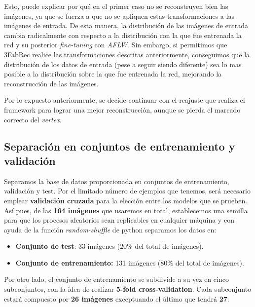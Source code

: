             \medskip
            
            \noindent Esto, puede explicar por qué en el primer caso no se reconstruyen bien las imágenes, ya que se fuerza a que no se apliquen estas transformaciones a las imágenes de entrada. De esta manera, la distribución de las imágenes de entrada cambia radicalmente con respecto a la distribución con la que fue entrenada la red y su posterior \textit{fine-tuning} con \textit{AFLW}. Sin embargo, si permitimos que 3FabRec realice las transformaciones descritas anteriormente, conseguimos que la distribución de los datos de entrada (pese a seguir siendo diferente) sea lo mas  posible a la distribución sobre la que fue entrenada la red, mejorando la reconstrucción de las imágenes. 
            
            \medskip
            
            
            \noindent Por lo expuesto anteriormente, se decide continuar con el reajuste que realiza el framework para lograr una mejor reconstrucción, aunque se pierda el marcado correcto del \textit{vertex}.

    \subsection{Separación en conjuntos de entrenamiento y validación}
        \noindent Separamos la base de datos proporcionada en conjuntos de entrenamiento, validación y test. Por el limitado número de ejemplos que tenemos, será necesario emplear \textbf{validación cruzada} para la elección entre los modelos que se prueben. Así pues, de las \textbf{164 imágenes} que usaremos en total, establecemos una semilla para que los procesos aleatorios sean replicables en cualquier máquina y con ayuda de la función \textit{random-shuffle} de python separamos los datos en: 

        \begin{itemize}
            \item \textbf{Conjunto de test}: 33 imágenes ($20\%$ del total de imágenes).
            \item \textbf{Conjunto de entrenamiento:} 131 imágenes ($80\%$ del total de imágenes).
        \end{itemize}

        \noindent Por otro lado, el conjunto de entrenamiento se subdivide a su vez en cinco subconjuntos, con la idea de realizar \textbf{5-fold cross-validation}. Cada subconjunto estará compuesto por \textbf{26 imágenes} exceptuando el último que tendrá \textbf{27}.
        
